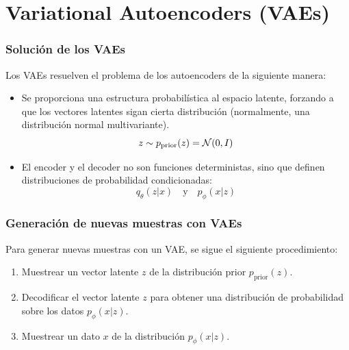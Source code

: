\documentclass{beamer}
\begin{document}
\section{Variational Autoencoders (VAEs)}

\begin{frame}
    \frametitle{Solución de los VAEs}

    Los VAEs resuelven el problema de los autoencoders de la siguiente manera:
    \begin{itemize}
        \item Se proporciona una estructura probabilística al espacio latente, forzando a que los vectores latentes sigan cierta distribución (normalmente, una distribución normal multivariante).
        \begin{equation*}
            z \sim p_{\text{prior}}(z) = \mathcal{N}(0, I)
        \end{equation*}\pause
        \item El encoder y el decoder no son funciones deterministas, sino que definen distribuciones de probabilidad condicionadas:
        \begin{equation*}
            q_\theta(z|x) \quad \text{y} \quad p_\phi(x|z)
        \end{equation*}
    \end{itemize}
\end{frame}

\begin{frame}
    \frametitle{Generación de nuevas muestras con VAEs}

    Para generar nuevas muestras con un VAE, se sigue el siguiente procedimiento:
    \begin{enumerate}
        \item Muestrear un vector latente $z$ de la distribución prior $p_{\text{prior}}(z)$.\pause
        \item Decodificar el vector latente $z$ para obtener una distribución de probabilidad sobre los datos $p_\phi(x|z)$.\pause
        \item Muestrear un dato $x$ de la distribución $p_\phi(x|z)$.
    \end{enumerate}
\end{frame}
\end{document}
